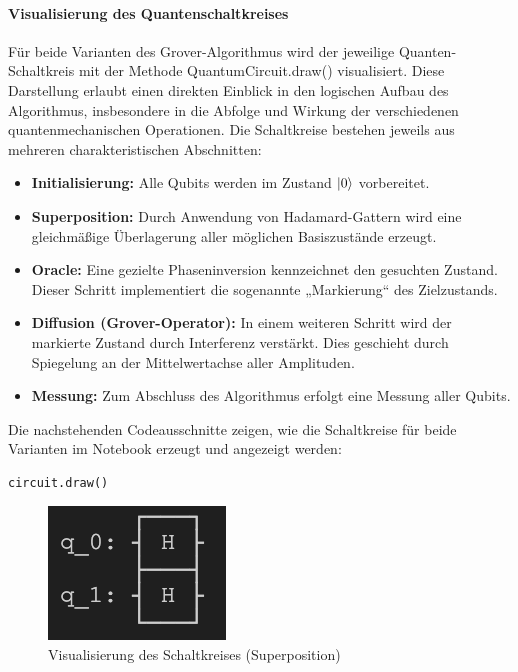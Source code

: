 \paragraph*{Visualisierung des Quantenschaltkreises}
\mbox{}

Für beide Varianten des Grover-Algorithmus wird der jeweilige Quanten-Schaltkreis mit der Methode QuantumCircuit.draw() visualisiert. Diese Darstellung erlaubt einen direkten Einblick in den logischen Aufbau des Algorithmus, insbesondere in die Abfolge und Wirkung der verschiedenen quantenmechanischen Operationen. Die Schaltkreise bestehen jeweils aus mehreren charakteristischen Abschnitten:
\begin{itemize}
    \item \textbf{Initialisierung:} Alle Qubits werden im Zustand $\ket{0}$    vorbereitet.
    \item \textbf{Superposition:} Durch Anwendung von Hadamard-Gattern wird eine gleichmäßige Überlagerung aller möglichen Basiszustände erzeugt.
    \item \textbf{Oracle:} Eine gezielte Phaseninversion kennzeichnet den gesuchten Zustand. Dieser Schritt implementiert die sogenannte „Markierung“ des Zielzustands.
    \item \textbf{Diffusion (Grover-Operator):} In einem weiteren Schritt wird der markierte Zustand durch Interferenz verstärkt. Dies geschieht durch Spiegelung an der Mittelwertachse aller Amplituden.
    \item \textbf{Messung:} Zum Abschluss des Algorithmus erfolgt eine Messung aller Qubits.
\end{itemize}
\noindent
Die nachstehenden Codeausschnitte zeigen, wie die Schaltkreise für beide
Varianten im Notebook erzeugt und angezeigt werden:

\begin{verbatim}
circuit.draw()
\end{verbatim}

  \begin{figure}
      \includegraphics[width=0.25\linewidth]{circuit_superposition.png}
      \caption{Visualisierung des Schaltkreises (Superposition)}
      \label{fig:enter-label}
\end{figure}

